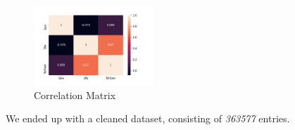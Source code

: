 \begin{figure}[!h]
\centering
\includegraphics[width=0.4\textwidth]{img/dataset_corr.png}
\caption{Correlation Matrix}
\label{fig:dataset_corr}
\end{figure}

We ended up with a cleaned dataset, consisting of \emph{363577} entries.
